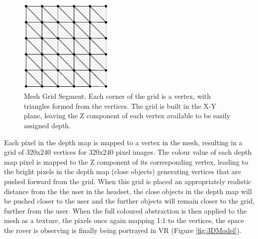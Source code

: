 \begin{figure}[H]
    \begin{center}
      \includegraphics[width=0.4\textwidth]{Figures/mesh.pdf}
      \caption[Mesh Grid Segment]{Mesh Grid Segment. Each corner of the grid is a vertex, with triangles formed from the vertices. The grid is built in the X-Y plane, leaving the Z component of each vertex available to be easily assigned depth.}
      \label{fig:mesh}
    \end{center}
\end{figure}

Each pixel in the depth map is mapped to a vertex in the mesh, resulting in a grid of 320x240 vertices for 320x240 pixel images. The colour value of each depth map pixel is mapped to the Z component of its corresponding vertex, leading to the bright pixels in the depth map (close objects) generating vertices that are pushed forward from the grid. When this grid is placed an appropriately realistic distance from the the user in the headset, the close objects in the depth map will be pushed closer to the user and the further objects will remain closer to the grid, further from the user. When the full coloured abstraction is then applied to the mesh as a texture, the pixels once again mapping 1:1 to the vertices, the space the rover is observing is finally being portrayed in VR (Figure \ref{fig:3DModel}).


